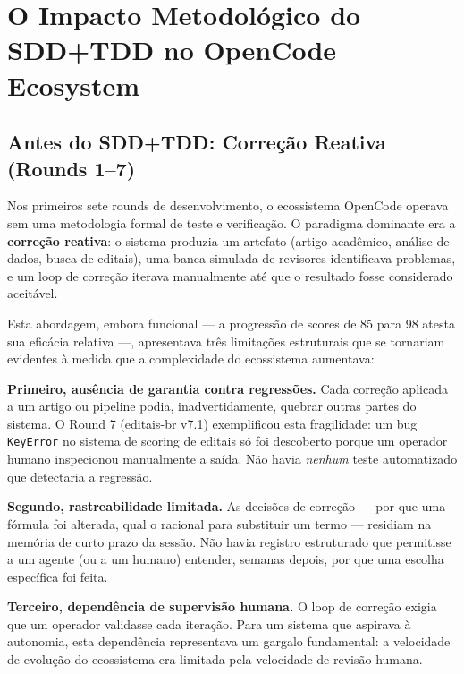 
\section{O Impacto Metodológico do SDD+TDD no OpenCode Ecosystem}

\subsection{Antes do SDD+TDD: Correção Reativa (Rounds 1--7)}

Nos primeiros sete rounds de desenvolvimento, o ecossistema OpenCode operava
sem uma metodologia formal de teste e verificação. O paradigma dominante era
a \textbf{correção reativa}: o sistema produzia um artefato (artigo acadêmico,
análise de dados, busca de editais), uma banca simulada de revisores
identificava problemas, e um loop de correção iterava manualmente até que o
resultado fosse considerado aceitável.

Esta abordagem, embora funcional — a progressão de scores de 85 para 98
atesta sua eficácia relativa —, apresentava três limitações estruturais que
se tornariam evidentes à medida que a complexidade do ecossistema aumentava:

\textbf{Primeiro, ausência de garantia contra regressões.} Cada correção
aplicada a um artigo ou pipeline podia, inadvertidamente, quebrar outras
partes do sistema. O Round 7 (editais-br v7.1) exemplificou esta fragilidade:
um bug \texttt{KeyError} no sistema de scoring de editais só foi descoberto
porque um operador humano inspecionou manualmente a saída. Não havia
\textit{nenhum} teste automatizado que detectaria a regressão.

\textbf{Segundo, rastreabilidade limitada.} As decisões de correção — por que
uma fórmula foi alterada, qual o racional para substituir um termo — residiam
na memória de curto prazo da sessão. Não havia registro estruturado que
permitisse a um agente (ou a um humano) entender, semanas depois, por que
uma escolha específica foi feita.

\textbf{Terceiro, dependência de supervisão humana.} O loop de correção
exigia que um operador validasse cada iteração. Para um sistema que aspirava à
autonomia, esta dependência representava um gargalo fundamental: a velocidade
de evolução do ecossistema era limitada pela velocidade de revisão humana.

